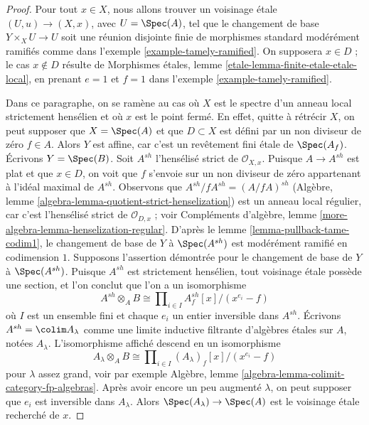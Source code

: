 \begin{proof}
Pour tout $x \in X$, nous allons trouver un voisinage \'etale
$(U, u) \to (X, x)$, avec $U = \Spec(A)$, tel que le changement de base
$Y \times_X U \to U$ soit une réunion disjointe finie de morphismes standard
modérément ramifiés comme dans l'exemple \ref{example-tamely-ramified}.
On supposera $x \in D$ ; le cas $x \not \in D$ résulte de
Morphismes \'etales, lemme \ref{etale-lemma-finite-etale-etale-local},
en prenant $e = 1$ et $f = 1$ dans l'exemple \ref{example-tamely-ramified}.

\medskip\noindent
Dans ce paragraphe, on se ramène au cas où $X$ est le spectre d'un
anneau local strictement hensélien et où $x$ est le point fermé. En effet, quitte à rétrécir
$X$, on peut supposer que $X = \Spec(A)$ et que $D \subset X$ est défini par un
non diviseur de zéro $f \in A$. Alors $Y$ est affine, car c'est un revêtement fini
\'etale de $\Spec(A_f)$. Écrivons $Y = \Spec(B)$.
Soit $A^{sh}$ l'hensélisé strict de $\mathcal{O}_{X, x}$.
Puisque $A \to A^{sh}$ est plat et que $x \in D$, on voit que $f$ s'envoie
sur un non diviseur de zéro appartenant à l'idéal maximal de $A^{sh}$.
Observons que $A^{sh}/fA^{sh} = (A/fA)^{sh}$
(Algèbre, lemme \ref{algebra-lemma-quotient-strict-henselization})
est un anneau local régulier, car c'est l'hensélisé strict de $\mathcal{O}_{D, x}$ ;
voir Compléments d'algèbre, lemme \ref{more-algebra-lemma-henselization-regular}.
D'après le lemme \ref{lemma-pullback-tame-codim1},
le changement de base de $Y$ à $\Spec(A^{sh})$ est modérément ramifié en
codimension $1$. Supposons l'assertion démontrée pour le changement de base
de $Y$ à $\Spec(A^{sh})$. Puisque $A^{sh}$ est strictement hensélien, tout
voisinage \'etale possède une section, et l'on conclut que l'on a un isomorphisme
$$
A^{sh} \otimes_A B \cong
\prod\nolimits_{i \in I} A^{sh}_f[x]/(x^{e_i} - f)
$$
où $I$ est un ensemble fini et chaque $e_i$ un entier inversible dans $A^{sh}$.
Écrivons $A^{sh} = \colim A_\lambda$ comme une limite inductive filtrante d'algèbres \'etales
sur $A$, notées $A_\lambda$. L'isomorphisme affiché
descend en un isomorphisme
$$
A_\lambda \otimes_A B \cong \prod\nolimits_{i \in I}
(A_\lambda)_f[x]/(x^{e_i} - f)
$$
pour $\lambda$ assez grand, voir par exemple
Algèbre, lemme \ref{algebra-lemma-colimit-category-fp-algebras}.
Après avoir encore un peu augmenté $\lambda$,
on peut supposer que $e_i$ est inversible dans $A_\lambda$. Alors
$\Spec(A_\lambda) \to \Spec(A)$ est le voisinage \'etale recherché
de $x$.


\end{proof}
